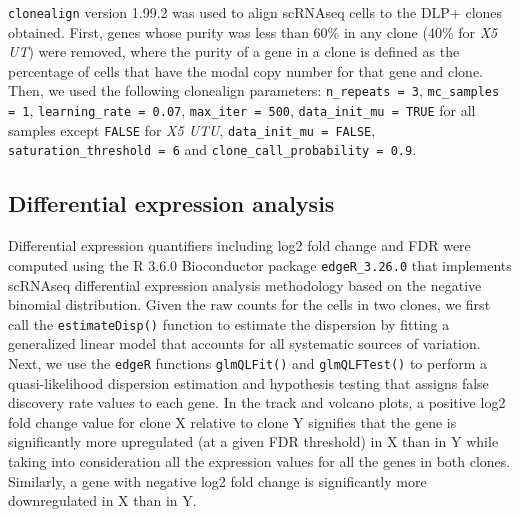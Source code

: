 \texttt{clonealign} version 1.99.2 was used to align scRNAseq cells to the DLP+ clones obtained. First, genes whose purity was less than 60\% in any clone (40\% for \textit{X5 UT}) were removed, where the purity of a gene in a clone  is defined as the percentage of cells that have the modal copy number for that gene and clone. Then, we used the following clonealign parameters: \texttt{n\_repeats = 3}, \texttt{mc\_samples = 1}, \texttt{learning\_rate = 0.07}, \texttt{max\_iter = 500}, \texttt{data\_init\_mu = TRUE} for all samples except \texttt{FALSE} for \textit{X5 UTU}, \texttt{data\_init\_mu = FALSE},
\texttt{saturation\_threshold = 6} and \texttt{clone\_call\_probability = 0.9}.

\subsection{Differential expression analysis}
Differential expression quantifiers including log2 fold change and FDR  were computed using the R 3.6.0 Bioconductor package \texttt{edgeR\_3.26.0} that implements scRNAseq differential expression analysis methodology based on the negative binomial distribution. Given the raw counts for the cells in two clones, we first call the \texttt{estimateDisp()} function to estimate the dispersion by fitting a generalized linear model that accounts for all systematic sources of variation. Next, we use the \texttt{edgeR} functions \texttt{glmQLFit()} and \texttt{glmQLFTest()} to perform a quasi-likelihood dispersion estimation and hypothesis testing that assigns false discovery rate values to each gene. In the track and volcano plots, a positive log2 fold change value for clone X relative to clone Y signifies that the gene is significantly more upregulated (at a given FDR threshold) in X than in Y while taking into consideration all the expression values for all the genes in both clones. Similarly, a gene with negative log2 fold change is significantly more downregulated in X than in Y. 